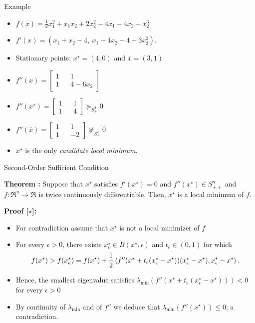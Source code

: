 \documentclass[9pt]{beamer}
\begin{document}
\begin{frame}{Example}

  \begin{itemize}
    \setlength\itemsep{1.5em}
  \item $f(x) =\frac{1}{2} x_1^2 +x_1 x_2 +2 x_2^2 -4x_1-4 x_2-x_2^3$\\
  \item $f'(x)= (x_1+x_2-4,~x_1+4x_2-4-3x_2^2)$. \\
  \item Stationary points: $x^\star=(4,0)$ and $\bar{x}=(3,1)$
  \item $f''( x) =\left[
      \begin{array}{ccc}
        1  & & 1   \\
        1 & & 4-6 x_2
      \end{array}
    \right]$
  \item $f''(x^\star) =\left[
      \begin{array}{ccc}
        1  & & 1   \\
        1 & & 4
      \end{array}
    \right]\succeq_{S^2_+} 0$
  \item $f''(\bar{x}) =\left[
      \begin{array}{ccc}
        1  & & 1   \\
        1 & & -2
      \end{array}
    \right]\not\succeq_{S^2_+} 0$
  \item $x^\star$ is the only \emph{candidate local minimum}.
  \end{itemize}
  
\end{frame}

\begin{frame}{Second-Order Sufficient Condition}

  \textbf{Theorem : } Suppose that $x^\star$ satisfies $f'(x^\star)=0$ and $f''(x^\star)\in S^n_{++}$ and $f:\Re^n\to\Re$ is twice continuously differentiable. Then, $x^\star$ is a local minimum of $f$.

  \vfill

  \textbf{Proof [$\star$]: }

  \begin{itemize}
  \item For contradiction assume that $x^\star$ is not a local minimizer of $f$
  \item<2-> For every $\epsilon > 0$, there exists $x^\star_\epsilon\in B(x^\star, \epsilon)$ and $t_\epsilon\in (0,1)$ for which
    \[
      f(x^\star) > f(x^\star_\epsilon) = f(x^\star) + \frac12 \left<f''(x^\star+t_\epsilon (x_\epsilon^\star-x^\star)) (x_\epsilon^\star-x^\star), x_\epsilon^\star-x^\star\right>.
    \]
  \item<3-> Hence, the smallest eigenvalue satisfies $\lambda_{\min}(f''(x^\star+t_\epsilon (x_\epsilon^\star-x^\star))) < 0$ for every $\epsilon > 0$
  \item<4-> By continuity of $\lambda_{\min}$ and of $f''$ we deduce that $\lambda_{\min}(f''(x^\star))\leq 0$; a contradiction.
  \end{itemize}
  
\end{frame}
\end{document}

